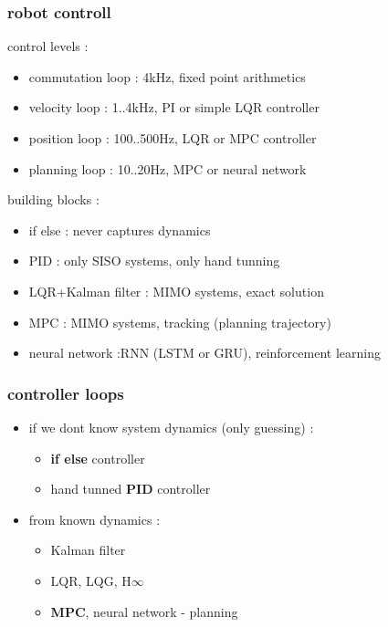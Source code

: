 \documentclass{beamer}
\begin{document}
\begin{frame}
  \frametitle{\bf robot controll}

  control levels :
  \begin{itemize}
    \item commutation loop : 4kHz, fixed point arithmetics
    \item velocity  loop   : 1..4kHz, PI or simple LQR controller
    \item position loop    : 100..500Hz, LQR or MPC controller
    \item planning loop    : 10..20Hz, MPC or neural network
  \end{itemize}

  building blocks :
  \begin{itemize}
    \item if else : never captures dynamics
    \item PID     : only SISO systems, only hand tunning
    \item LQR+Kalman filter : MIMO systems, exact solution
    \item MPC : MIMO systems, tracking (planning trajectory)
    \item neural network :RNN (LSTM or GRU), reinforcement learning
  \end{itemize}

\end{frame}





\begin{frame}
  \frametitle{\bf controller loops}


  \begin{itemize}
    \item if we dont know system dynamics (only guessing) : 
      \begin{itemize}
        \item {\bf{if else}} controller
        \item hand tunned {\bf{PID}} controller
      \end{itemize}
    \item from known dynamics :
      \begin{itemize}
        \item Kalman filter
        \item LQR, LQG, H$\infty$
        \item {\bf{MPC}}, neural network - planning
      \end{itemize}
  \end{itemize}

\end{frame}
\end{document}

